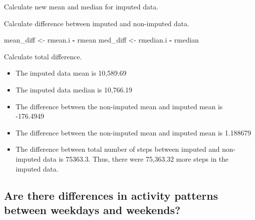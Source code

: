 \documentclass[]{article}
\newenvironment{Shaded}{\begin{snugshade}}{\end{snugshade}}
\newcommand{\KeywordTok}[1]{\textcolor[rgb]{0.13,0.29,0.53}{\textbf{#1}}}
\newcommand{\StringTok}[1]{\textcolor[rgb]{0.31,0.60,0.02}{#1}}
\newcommand{\OperatorTok}[1]{\textcolor[rgb]{0.81,0.36,0.00}{\textbf{#1}}}
\newcommand{\NormalTok}[1]{#1}
\providecommand{\tightlist}{%
  \setlength{\itemsep}{0pt}\setlength{\parskip}{0pt}}
\begin{document}
Calculate new mean and median for imputed data.

\begin{Shaded}
\end{Shaded}

Calculate difference between imputed and non-imputed data.

\begin{Shaded}
\begin{Highlighting}[]
\NormalTok{mean_diff <-}\StringTok{ }\NormalTok{rmean.i }\OperatorTok{-}\StringTok{ }\NormalTok{rmean}
\NormalTok{med_diff <-}\StringTok{ }\NormalTok{rmedian.i }\OperatorTok{-}\StringTok{ }\NormalTok{rmedian}
\end{Highlighting}
\end{Shaded}

Calculate total difference.

\begin{Shaded}
\end{Shaded}

\begin{itemize}
\tightlist
\item
  The imputed data mean is 10,589.69
\item
  The imputed data median is 10,766.19
\item
  The difference between the non-imputed mean and imputed mean is
  -176.4949
\item
  The difference between the non-imputed mean and imputed mean is
  1.188679
\item
  The difference between total number of steps between imputed and
  non-imputed data is 75363.3. Thus, there were 75,363.32 more steps in
  the imputed data.
\end{itemize}

\subsection{Are there differences in activity patterns between weekdays
and
weekends?}\label{are-there-differences-in-activity-patterns-between-weekdays-and-weekends}
\end{document}

